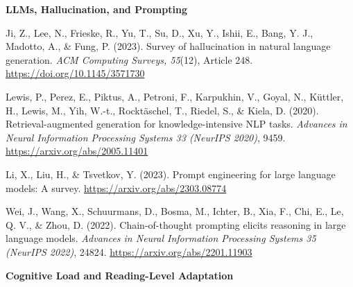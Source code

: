 \documentclass[11pt,letterpaper]{article}
\begin{document}
\vspace{0.7em}
{\sffamily\bfseries\small\color{accent}LLMs, Hallucination, and Prompting}\vspace{-0.2em}

\begin{list}{}{%
  \setlength{\leftmargin}{1.4em}
  \setlength{\itemindent}{-1.4em}
  \setlength{\itemsep}{0.35em}
  \setlength{\parsep}{0pt}
}

\item Ji, Z., Lee, N., Frieske, R., Yu, T., Su, D., Xu, Y., Ishii, E.,
Bang, Y. J., Madotto, A., \& Fung, P. (2023). Survey of hallucination in
natural language generation. \textit{ACM Computing Surveys, 55}(12),
Article 248. \url{https://doi.org/10.1145/3571730}

\item Lewis, P., Perez, E., Piktus, A., Petroni, F., Karpukhin, V., Goyal, N.,
K\"uttler, H., Lewis, M., Yih, W.-t., Rockt\"aschel, T., Riedel, S., \&
Kiela, D. (2020). Retrieval-augmented generation for knowledge-intensive NLP
tasks. \textit{Advances in Neural Information Processing Systems 33 (NeurIPS
2020)}, 9459. \url{https://arxiv.org/abs/2005.11401}

\item Li, X., Liu, H., \& Tsvetkov, Y. (2023). Prompt engineering for large
language models: A survey. \url{https://arxiv.org/abs/2303.08774}

\item Wei, J., Wang, X., Schuurmans, D., Bosma, M., Ichter, B., Xia, F.,
Chi, E., Le, Q. V., \& Zhou, D. (2022). Chain-of-thought prompting elicits
reasoning in large language models. \textit{Advances in Neural Information
Processing Systems 35 (NeurIPS 2022)}, 24824.
\url{https://arxiv.org/abs/2201.11903}

\end{list}

\vspace{0.7em}
{\sffamily\bfseries\small\color{accent}Cognitive Load and Reading-Level Adaptation}\vspace{-0.2em}
\end{document}
